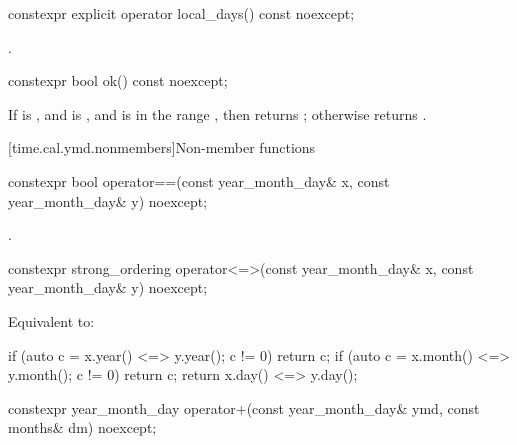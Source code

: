 %
\begin{itemdecl}
constexpr explicit operator local_days() const noexcept;
\end{itemdecl}

\begin{itemdescr}
\pnum
\returns
{}.
\end{itemdescr}

%
\begin{itemdecl}
constexpr bool ok() const noexcept;
\end{itemdecl}

\begin{itemdescr}
\pnum
\returns
If  is ,
and  is ,
and  is in the range ,
then returns ; otherwise returns .
\end{itemdescr}

[time.cal.ymd.nonmembers]{Non-member functions}

%
\begin{itemdecl}
constexpr bool operator==(const year_month_day& x, const year_month_day& y) noexcept;
\end{itemdecl}

\begin{itemdescr}
\pnum
\returns
{}.
\end{itemdescr}

%
\begin{itemdecl}
constexpr strong_ordering operator<=>(const year_month_day& x, const year_month_day& y) noexcept;
\end{itemdecl}

\begin{itemdescr}
\pnum
\effects
Equivalent to:
\begin{codeblock}
if (auto c = x.year() <=> y.year(); c != 0) return c;
if (auto c = x.month() <=> y.month(); c != 0) return c;
return x.day() <=> y.day();
\end{codeblock}
\end{itemdescr}

%
\begin{itemdecl}
constexpr year_month_day operator+(const year_month_day& ymd, const months& dm) noexcept;
\end{itemdecl}

